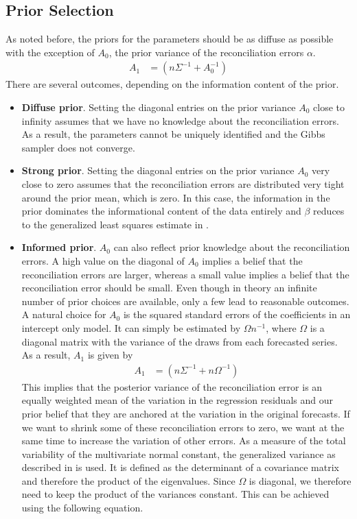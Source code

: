 \documentclass[a4paper,fleqn,11pt]{article}
\begin{document}
\subsection{Prior Selection}
As noted before, the priors for the parameters should be as diffuse as possible with the exception of $A_0$, the prior variance of the reconciliation errors $\alpha$. 
\begin{align*}
	A_1 &= \left(n\Sigma^{-1} + A_0^{-1}\right)
\end{align*}
There are several outcomes, depending on the information content of the prior.
\begin{itemize}
    \item\textbf{Diffuse prior}. Setting the diagonal entries on the prior variance $A_0$ close to infinity assumes that we have no knowledge about the reconciliation errors. As a result, the parameters cannot be uniquely identified and the Gibbs sampler does not converge.
    \item \textbf{Strong prior}. Setting the diagonal entries on the prior variance $A_0$ very close to zero assumes that the reconciliation errors are distributed very tight around the prior mean, which is zero. In this case, the information in the prior dominates the informational content of the data entirely and $\beta$ reduces to the generalized least squares estimate in \cite{Hyndman2016}. 
    \item \textbf{Informed prior}. $A_0$ can also reflect prior knowledge about the reconciliation errors. A high value on the diagonal of $A_0$ implies a belief that the reconciliation errors are larger, whereas a small value implies a belief that the reconciliation error should be small. Even though in theory an infinite number of prior choices are available, only a few lead to reasonable outcomes.\\
    A natural choice for $A_0$ is the squared standard errors of the coefficients in an intercept only model. It can simply be estimated by $\Omega n^{-1}$, where $\Omega $ is a diagonal matrix with the variance of the draws from each forecasted series. As a result, $A_1$ is given by
\begin{align*}
	A_1 &= \left(n\Sigma^{-1} + n\Omega^{-1} \right)
\end{align*}
    This implies that the posterior variance of the reconciliation error is an equally weighted mean of the variation in the regression residuals and our prior belief that they are anchored at the variation in the original forecasts. If we want to shrink some of these reconciliation errors to zero, we want at the same time to increase the variation of other errors. As a measure of the total variability of the multivariate normal constant, the generalized variance as described in \cite{Mutonen1997} is used. It is defined as the determinant of a covariance matrix and therefore the product of the eigenvalues. Since $\Omega$ is diagonal, we therefore need to keep the product of the variances constant. This can be achieved using the following equation.

\end{itemize}
\end{document}
